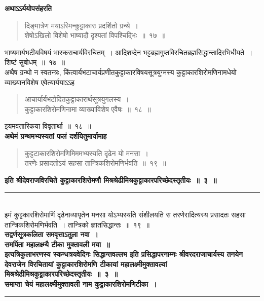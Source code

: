 \documentclass[11pt, openany]{book}
\begin{document}
\newpage
\thispagestyle{fancy}
\fancyhf{}
\indent
\textbf{अथाऽऽर्ययोपसंहरति\textendash}
\begin{quote}
{\ks दिङ्मात्रेण मयाऽस्मिन्कुट्टाकारः प्रदर्शितो ग्रन्थे~।\\
शेषोऽखिलो विशेषो भाष्यादौ दृश्यतां विपश्चिद्भिः~॥~१७~॥}
\end{quote}

\indent
भाष्यमार्यभटीयविषयं भास्कराचार्यविरचितम्~। आदिशब्देन भट्टब्रह्मगुप्तविरचितब्रह्मसिद्धान्तादिरभिधीयते~। शिष्टं सुबोधम्~॥~१७~॥\\
\indent
अथैष ग्रन्थो न स्वतन्त्रः, किंत्वार्यभटाचार्यप्रणीतकुट्टाकारविषयसूत्रयुग्मस्य कुट्टाकारशिरोमणिनामधेयो व्याख्यानविशेष एवेत्यार्ययाऽऽह\textendash
\begin{quote}
{\ks आचार्यार्यभटोदितकुट्टाकारार्थसूत्रयुगलस्य~।\\
कुट्टाकारशिरोमणिनामा व्याख्याविशेष एवैषः~॥~१८~॥}
\end{quote}
\indent
इयमवतारिकया विवृतार्था~॥~१८~॥\\

\textbf{अथेमं ग्रन्थमभ्यस्यतां फलं दर्शयितुमार्यामाह\textendash}
\begin{quote}
{\ks कुट्टटाकारशिरोमणिमिममभ्यस्यति दृढेन यो मनसा~।\\
तरणेः प्रसादतोऽयं सहसा तान्त्रिकशिरोमणिर्भवति~॥~१९~॥}
\end{quote}
\centering
\textbf{इति श्रीदेवराजविरचिते कुट्टाकारशिरोमणौ मिश्रश्रेढीमिश्रकुट्टाकारपरिच्छेदस्तृतीयः~॥~३~॥\\}
\rule{0.2\linewidth}{1.0pt}\\

\vspace{1cm}
\justifying
\indent
इमं कुट्टकारशिरोमाणिं दृढेनाव्यापृतेन मनसा योऽभ्यस्यति संशीलयति स
तरणेरादित्यस्य प्रसादतः सहसा तान्त्रिकशिरोमणिर्भवति~। तान्त्रिको ज्ञातसिद्धान्तः~॥~१९~॥\\

\centering
\indent
 \textbf{सद्वर्णसूत्रकलिता समवृत्ताऽतुला नवा~।\\
  समर्पिता महालक्ष्म्यै टीका मुक्तावली मया~॥}\\

\indent
\textbf{इत्यत्रिकुलाभरणस्य स्कन्धत्रयवेदिनः सिद्धान्तवल्लभ इति प्रसिद्धापरनाम्नः
श्रीवरदराजाचार्यस्य तनयेन देवराजेन विरचितायां कुट्टाकारशिरोमणि
टीकायां महालक्ष्मीमुक्तावल्यां मिश्रश्रेढीमिश्रकुट्टाकारपरिच्छेदस्तृतीयः~॥~३~॥\\
}
\indent
\textbf{समाप्ता चेयं महालक्ष्मीमुक्तावली नाम कुट्टाकारशिरोमणिटीका~।\\
}
\centering
\rule{0.2\linewidth}{1.0pt}


 
\end{document}
